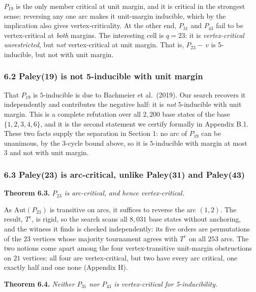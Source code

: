 \documentclass[
]{article}
\newcounter{none} %
\begin{document}

\(P_{19}\) is the only member critical at unit margin, and it is
critical in the strongest sense: reversing any one arc makes it
unit-margin inducible, which by the implication also gives
vertex-criticality. At the other end, \(P_{31}\) and \(P_{43}\) fail to
be vertex-critical at \emph{both} margins. The interesting cell is
\(q = 23\): it is \emph{vertex-critical unrestricted}, but \emph{not}
vertex-critical at unit margin. That is, \(P_{23} -\,v\) is 5-inducible,
but not with unit margin.

\subsubsection{6.2 Paley(19) is not 5-inducible with unit
margin}\label{paley19-is-not-5-inducible-with-unit-margin}

That \(P_{19}\) is \(5\)-inducible is due to Bachmeier et al.~(2019).
Our search recovers it independently and contributes the negative half:
it is \emph{not} \(5\)-inducible with unit margin. This is a complete
refutation over all \(2{,}200\) base states of the base
\(\{1,2,3,4,6\}\), and it is the second statement we certify formally in
Appendix B.1. These two facts supply the separation in Section 1: no arc
of \(P_{19}\) can be unanimous, by the \(3\)-cycle bound above, so it is
\(5\)-inducible with margin at most \(3\) and not with unit margin.

\subsubsection{6.3 Paley(23) is arc-critical, unlike Paley(31) and
Paley(43)}\label{paley23-is-arc-critical-unlike-paley31-and-paley43}

\textbf{Theorem 6.3.} \emph{\(P_{23}\) is arc-critical, and hence
vertex-critical.}

As \(\mathrm{Aut}(P_{23})\) is transitive on arcs, it suffices to
reverse the arc \((1,2)\). The result, \(T^{e}\), is rigid, so the
search scans all \(8{,}031\) base states without anchoring, and the
witness it finds is checked independently: its five orders are
permutations of the \(23\) vertices whose majority tournament agrees
with \(T^{e}\) on all \(253\) arcs. The two notions come apart among the
four vertex-transitive unit-margin obstructions on \(21\) vertices: all
four are vertex-critical, but two have every arc critical, one exactly
half and one none (Appendix H).

\textbf{Theorem 6.4.} \emph{Neither \(P_{31}\) nor \(P_{43}\) is
vertex-critical for 5-inducibility.}
\end{document}
